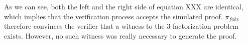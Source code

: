 \begin{example}
As we can see, both the left and the right side of equation XXX are identical, which implies that the verification process accepts the simulated proof. $\pi_{fake}$ therefore convinces the verifier that a witness to the $3$-factorization problem exists. However, no such witness was really necessary to generate the proof.
\end{example}












